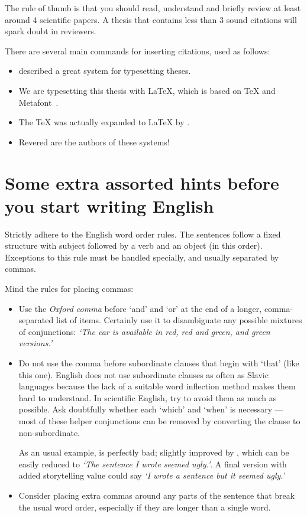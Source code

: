 \begin{description}
The rule of thumb is that you should read, understand and briefly review at least around 4 scientific papers. A thesis that contains less than 3 sound citations will spark doubt in reviewers.
\end{description}

There are several main commands for inserting citations, used as follows:
\begin{itemize}
\item \citet{knuth1979tex} described a great system for typesetting theses.
\item We are typesetting this thesis with LaTeX, which is based on TeX and Metafont~\cite{knuth1979tex}.
\item The TeX was actually expanded to LaTeX by \citet{lamport1994latex}.
\item Revered are the authors of these systems!~\cite{knuth1979tex,lamport1994latex}
\end{itemize}

\section{Some extra assorted hints before you start writing English}

Strictly adhere to the English word order rules. The sentences follow a fixed structure with subject followed by a verb and an object (in this order). Exceptions to this rule must be handled specially, and usually separated by commas.

Mind the rules for placing commas:
\begin{itemize}
\item Use the \emph{Oxford comma} before `and' and `or' at the end of a longer, comma-separated list of items. Certainly use it to disambiguate any possible mixtures of conjunctions: \textit{`The car is available in red, red and green, and green versions.'}
\item Do not use the comma before subordinate clauses that begin with `that' (like this one). English does not use subordinate clauses as often as Slavic languages because the lack of a suitable word inflection method makes them hard to understand. In scientific English, try to avoid them as much as possible. Ask doubtfully whether each `which' and `when' is necessary --- most of these helper conjunctions can be removed by converting the clause to non-subordinate.

As an usual example,  is perfectly bad; slightly improved by , which can be easily reduced to \textit{`The sentence I wrote seemed ugly.'}. A final version with added storytelling value could say \textit{`I wrote a sentence but it seemed ugly.'}
\item Consider placing extra commas around any parts of the sentence that break the usual word order, especially if they are longer than a single word.
\end{itemize}

